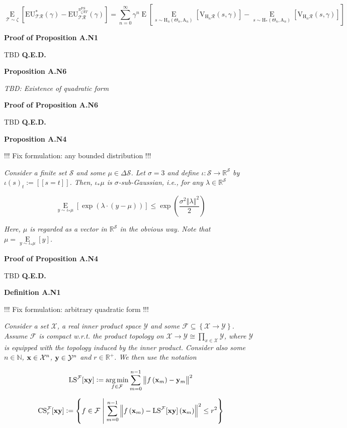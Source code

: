 \documentclass[a4paper]{article}
\newcommand{\Co}[1]{}
\newcommand{\AP}[1]{\left(#1\right)}
\newcommand{\AB}[1]{\left[#1\right]}
\newcommand{\AC}[1]{\left\{#1\right\}}
\newcommand{\ACM}[2]{\left\{#1\;\middle\vert\;#2\right\}}
\newcommand{\Ea}[2]{\underset{#1}{\operatorname{E}}\AB{#2}}
\newcommand{\Argmin}[1]{\underset{#1}{\operatorname{arg\,min}}\,}
\newcommand{\Nats}{\mathbb{N}}
\newcommand{\Reals}{\mathbb{R}}
\newcommand{\Norm}[1]{\left\Vert #1 \right\Vert}
\newcommand{\X}{\mathcal{X}}
\newcommand{\Y}{\mathcal{Y}}
\newcommand{\F}{\mathcal{F}}
\newcommand{\St}{\mathcal{S}}
\newcommand{\R}{\mathcal{R}}
\newcommand{\T}{\mathcal{T}}
\newcommand{\V}{\mathrm{V}}
\newcommand{\EU}{\mathrm{EU}}
\newcommand{\PSR}{\text{PS}}
\newcommand{\LS}{\mathrm{LS}}
\newcommand{\CS}{\mathrm{CS}}
\newcommand{\AT}{\mathrm{A}}
\newcommand{\THy}{\mathrm{H}_*}
\newcommand{\SHy}{\mathrm{H}}
\begin{document}
$$\Ea{\T\sim\zeta}{\EU^*_{\T\R}(\gamma)-\EU^{\pi_{\zeta\R T}^{\PSR}}_{\T\R}(\gamma)}=\sum_{n=0}^\infty\gamma^{n}\Ea{}{\Ea{s\sim \SHy_n\AP{\Theta_n,\AT_n}}{\V_{\SHy_n\R}(s,\gamma)}-\Ea{s\sim \THy\AP{\Theta_n,\AT_n}}{\V_{\SHy_n\R}(s,\gamma)}}$$

\textbf{Proof of Proposition A.N1}\Co{b}


TBD \textbf{Q.E.D.}\Co{b}

\textbf{Proposition A.N6}\Co{b}

\textit{TBD: Existence of quadratic form}\Co{i}

\textbf{Proof of Proposition A.N6}\Co{b}

TBD \textbf{Q.E.D.}\Co{b}

\textbf{Proposition A.N4}\Co{b}

!!! Fix formulation: any bounded distribution !!!

\textit{Consider a finite set $\St$ and some $\mu\in\Delta\St$. Let $\sigma=3$ and define $\iota:\St\rightarrow\Reals^\St$ by $\iota(s)_t:=[[s=t]]$. Then, $\iota_*\mu$ is $\sigma$-sub-Gaussian, i.e., for any $\lambda\in\Reals^\St$}\Co{i}

$$\Ea{y\sim\iota_*\mu}{\exp\AP{\lambda\cdot\AP{y-\mu}}} \leq \exp\AP{\frac{\sigma^2\Norm{\lambda}^2}{2}}$$

\textit{Here, $\mu$ is regarded as a vector in $\Reals^\St$ in the obvious way. Note that $\mu=\Ea{y\sim\iota_*\mu}{y}$.}\Co{i}

\textbf{Proof of Proposition A.N4}\Co{b}

TBD \textbf{Q.E.D.}\Co{b}

\textbf{Definition A.N1}\Co{b}

!!! Fix formulation: arbitrary quadratic form !!!

\textit{Consider a set $\X$, a real inner product space $\Y$ and some $\F\subseteq\AC{\X\rightarrow\Y}$. Assume $\F$ is compact w.r.t. the product topology on $\X\rightarrow\Y\cong\prod_{x\in\X}\Y$, where $\Y$ is equipped with the topology induced by the inner product. Consider also some $n\in\Nats$, $\bold{x}\in\X^n$, $\bold{y}\in\Y^n$ and $r\in\Reals^+$. We then use the notation}\Co{i}

$$\LS^\F[\bold{xy}]:=\Argmin{f\in\F}{\sum_{m=0}^{n-1}\Norm{f\AP{\bold{x}_m}-\bold{y}_m}^2}$$

$$\CS^\F_{r}[\bold{xy}]:=\ACM{f\in\F}{\sum_{m=0}^{n-1}\Norm{f\AP{\bold{x}_m}-\LS^\F[\bold{xy}]\AP{\bold{x}_m}}^2\leq r^2}$$
\end{document}
